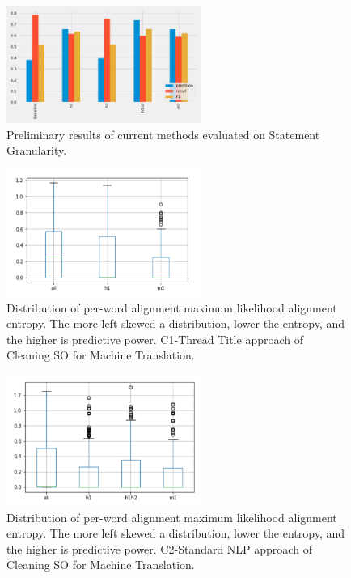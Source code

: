 \begin{figure}[!t]
\centering
\includegraphics[width=2.5in]{figures/all-methods-line.pdf}
\caption{Preliminary results of current methods evaluated on Statement Granularity.}
\label{fig:preliminary-results-line}
\end{figure}


\begin{figure}[!t]
\centering
\includegraphics[width=2.5in]{figures/title-machine-translation.png}
\caption{Distribution of per-word alignment maximum likelihood alignment entropy. The more left skewed a distribution, lower the entropy, and the higher is predictive power. C1-Thread Title approach of Cleaning SO for Machine Translation.}
\label{fig:preliminary-results-c1}
\end{figure}


\begin{figure}[!t]
\centering
\includegraphics[width=2.5in]{figures/post-body-machine-translation.png}
\caption{Distribution of per-word alignment maximum likelihood alignment entropy. The more left skewed a distribution, lower the entropy, and the higher is predictive power. C2-Standard NLP approach of Cleaning SO for Machine Translation.}
\label{fig:preliminary-results-c2}
\end{figure}